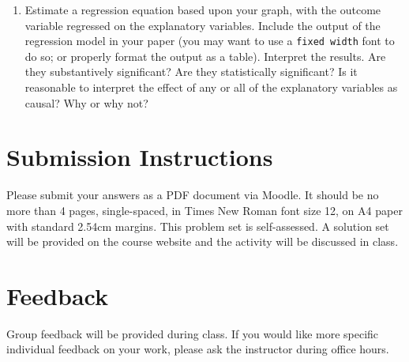 \documentclass[a4paper]{exam}
\begin{document}
\begin{enumerate}
\item Estimate a regression equation based upon your graph, with the outcome variable regressed on the explanatory variables. Include the output of the regression model in your paper (you may want to use a \texttt{fixed width} font to do so; or properly format the output as a table). Interpret the results. Are they substantively significant? Are they statistically significant? Is it reasonable to interpret the effect of any or all of the explanatory variables as causal? Why or why not?

\end{enumerate}

\section{Submission Instructions}\label{submission-instructions}

Please submit your answers as a PDF document via Moodle. It should be no more than 4 pages, single-spaced, in Times New Roman font size 12, on A4 paper with standard 2.54cm margins. This problem set is self-assessed. A solution set will be provided on the course website and the activity will be discussed in class.

\section{Feedback}\label{feedback}

Group feedback will be provided during class. If you would like more specific individual feedback on your work, please ask the instructor during office hours.
\end{document}
